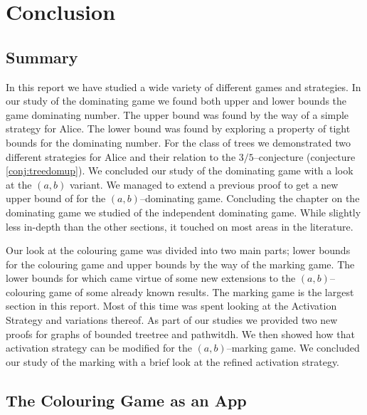 \chapter{Conclusion}\label{chpt:con}




\section{Summary}

In this report we have studied a wide variety of different games and strategies. In our study of the dominating game we found both upper and lower bounds the game dominating number. The upper bound was found by the way of a simple strategy for Alice. The lower bound was found by exploring a property of tight bounds for the dominating number. For the class of trees we demonstrated two different strategies for Alice and their relation to the $3/5$--conjecture (conjecture \ref{conj:treedomup}). We concluded our study of the dominating game with a look at the $(a,b)$ variant. We managed to extend a previous proof to get a new upper bound of for the $(a,b)$--dominating game. 
Concluding the chapter on the dominating game we studied of the independent dominating game. While slightly less in-depth than the other sections, it touched on most areas in the literature.

Our look at the colouring game was divided into two main parts; lower bounds for the colouring game and upper bounds by the way of the marking game. The lower bounds for which came virtue of some new extensions to the $(a,b)$--colouring game of some already known results.
The marking game is the largest section in this report. Most of this time was spent looking at the Activation Strategy and variations thereof. As part of our studies we provided two new proofs for graphs of bounded treetree and pathwitdh. We then showed how that activation strategy can be modified for the $(a,b)$--marking game. We concluded our study of the marking with a brief look at the refined activation strategy.

\section{The Colouring Game as an App}



